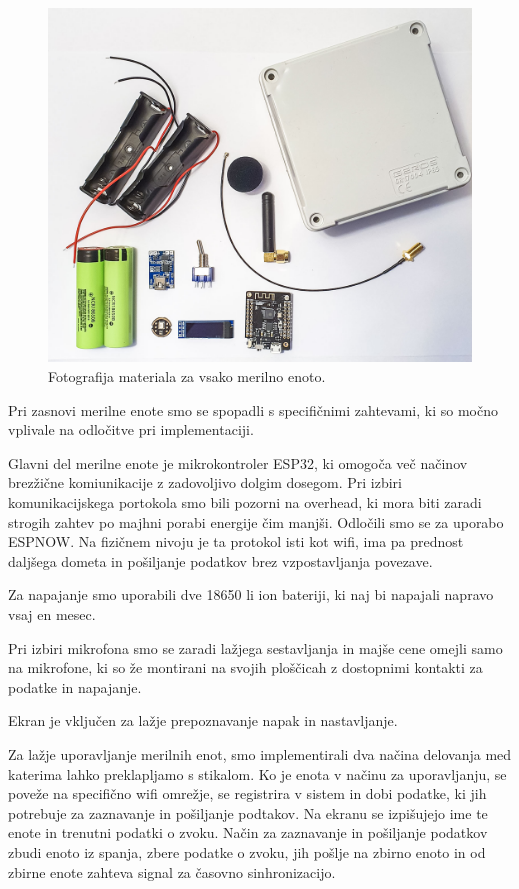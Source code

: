 \documentclass[a4paper, 12pt]{book}
\begin{document}
\begin{figure}[H]
    \centering
    \includegraphics[width=\linewidth]{slikovno_gradivo/merilna_enota_2.jpg}
    \caption{Fotografija materiala za vsako merilno enoto.}
    \label{fig:material_merilna}
\end{figure}


Pri zasnovi merilne enote smo se spopadli s specifičnimi zahtevami, ki so močno vplivale na odločitve pri implementaciji.

Glavni del merilne enote je mikrokontroler ESP32, ki omogoča več načinov brezžične komiunikacije z zadovoljivo dolgim dosegom. 
Pri izbiri komunikacijskega portokola smo bili pozorni na overhead, ki mora biti zaradi strogih zahtev po majhni porabi energije čim manjši. Odločili smo se za uporabo ESPNOW. Na fizičnem nivoju je ta protokol isti kot wifi, ima pa prednost daljšega dometa in pošiljanje podatkov brez vzpostavljanja povezave. 

Za napajanje smo uporabili dve 18650 li ion bateriji, ki naj bi napajali napravo vsaj en mesec. 

Pri izbiri mikrofona smo se zaradi lažjega sestavljanja in majše cene omejli samo na mikrofone, ki so že montirani na svojih ploščicah z dostopnimi kontakti za podatke in napajanje.

Ekran je vključen za lažje prepoznavanje napak in nastavljanje.

Za lažje uporavljanje merilnih enot, smo implementirali dva načina delovanja med katerima lahko preklapljamo s stikalom. 
Ko je enota v načinu za uporavljanju, se poveže na specifično wifi omrežje, se registrira v sistem in dobi podatke, ki jih potrebuje za zaznavanje in pošiljanje podtakov. Na ekranu se izpišujejo ime te enote in trenutni podatki o zvoku.
Način za zaznavanje in pošiljanje podatkov zbudi enoto iz spanja, zbere podatke o zvoku, jih pošlje na zbirno enoto in od zbirne enote zahteva signal za časovno sinhronizacijo.
\end{document}
